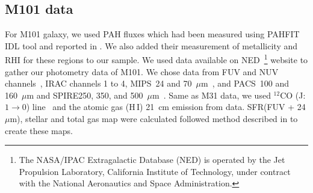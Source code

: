     \subsection{M101 data}
     For M101 galaxy, we used PAH fluxes which had been measured using {\tiny PAHFIT IDL} tool and reported in \cite{Gordon08}.
     We also added their measurement of metallicity and RHI for these regions to our sample.
     We used data available on NED~\footnote{The NASA/IPAC Extragalactic Database (NED) is operated by the Jet Propulsion Laboratory, California Institute of Technology, under contract with the National Aeronautics and Space Administration.} website to gather our photometry data of M101. 
     We chose data from \GALEX FUV and NUV channels~\citep{depaz07}, IRAC channels 1 to 4, MIPS~24 and 70~$\mu$m~\cite{Dale09}, and  PACS~100 and 160~$\mu$m and SPIRE250, 350, and 500~$\mu$m~\cite{Kennicutt11}.
     Same as M31 data, we used $^{12}$CO (J:$1\rightarrow0$) line~\citep{Helfer03} and the atomic gas (H\,{\sc I}) 21~cm emission from \cite{Walter08} data.
     SFR(FUV + 24$\mu$m), stellar and total gas map were calculated followed method described in \cite{Rahmani16} to create these maps.
     
     